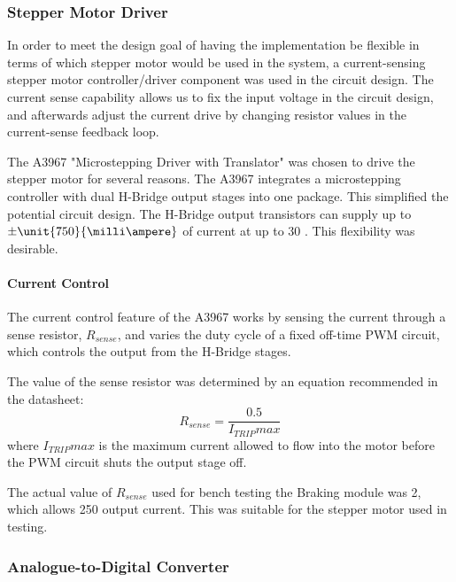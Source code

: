 \subsubsection{Stepper Motor Driver}

In order to meet the design goal of having the implementation be flexible in terms of which stepper motor would be used in the system, a current-sensing stepper motor controller/driver component was used in the circuit design. The current sense capability allows us to fix the input voltage in the circuit design, and afterwards adjust the current drive by changing resistor values in the current-sense feedback loop. 

The A3967 "Microstepping Driver with Translator" was chosen to drive the stepper motor for several reasons. The A3967 integrates a microstepping controller with dual H-Bridge output stages into one package. This simplified the potential circuit design. The H-Bridge output transistors can supply up to $\pm\unit{750}{\milli\ampere}$ of current at up to \unit{30}{\volt} \cite{A3967}. This flexibility was desirable.

\paragraph{Current Control}

The current control feature of the A3967 works by sensing the current through a sense resistor, $R_{sense}$, and varies the duty cycle of a fixed off-time PWM circuit, which controls the output from the H-Bridge stages.

The value of the sense resistor was determined by an equation recommended in the datasheet:
\begin{equation}
R_{sense}=\frac{0.5}{I_{TRIP}max}
\end{equation}
where $I_{TRIP}max$ is the maximum current allowed to flow into the motor before the PWM circuit shuts the output stage off.

The actual value of $R_{sense}$ used for bench testing the Braking module was \unit{2}{\ohm}, which allows \unit{250}{\milli\ampere} output current. This was suitable for the stepper motor used in testing.

\subsubsection{Analogue-to-Digital Converter}

